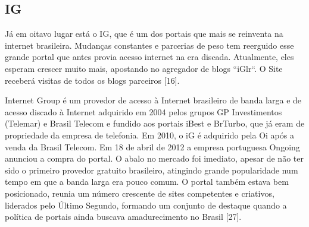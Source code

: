 \documentclass[a4paper]{article}
\begin{document}
\begin{titlepage}
\subsection{IG}

Já em oitavo lugar está o IG, que é um dos portais que mais se reinventa na internet brasileira. Mudanças constantes e parcerias de peso tem reerguido esse grande portal que antes provia acesso internet na era discada. Atualmente, eles esperam crescer muito mais, apostando no agregador de blogs “iGlr“. O Site receberá visitas de todos os blogs parceiros [16].

Internet Group é um provedor de acesso à Internet brasileiro de banda larga e de acesso discado à Internet adquirido em 2004  pelos grupos GP Investimentos (Telemar) e Brasil Telecom e fundido aos portais iBest e BrTurbo, que já eram de propriedade da empresa de telefonia. Em 2010, o iG é adquirido pela Oi após a venda da Brasil Telecom. Em 18 de abril de 2012 a empresa portuguesa Ongoing anunciou a compra do portal. O abalo no mercado foi imediato, apesar de não ter sido o primeiro provedor gratuito brasileiro, atingindo grande popularidade num tempo em que a banda larga era pouco comum. O portal também estava bem posicionado, reunia um número crescente de sites competentes e criativos, liderados pelo Último Segundo, formando um conjunto de destaque quando a política de portais ainda buscava amadurecimento no Brasil [27].


\end{titlepage}
\end{document}
